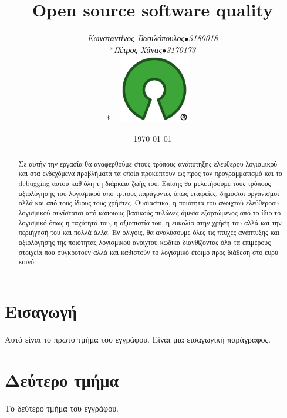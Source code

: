 \documentclass{article}
\title{\textbf{\textlatin{Open source software quality}}}
\author{{\textit{Κωνσταντίνος Βασιλόπουλος\(\bullet\)3180018}\\*\textit{Πέτρος Χάνας\(\bullet\)3170173}}\\*\includegraphics[width=4cm, height=3cm]{oSource}}
\date{\today}
\begin{document}
\maketitle

\begin{abstract}
Σε αυτήν την εργασία θα αναφερθούμε στους τρόπους ανάπυτηξης ελεύθερου λογισμικού
και στα ενδεχόμενα προβλήματα τα οποία προκύπτουν ως προς τον προγραμματισμό και το 
\textlatin{debugging} αυτού καθ'όλη τη διάρκεια ζωής του. Επίσης θα μελετήσουμε τους 
τρόπους αξιολόγησης του λογισμικού από τρίτους παράγοντες όπως εταιρείες, δημόσιοι οργανισμοί 
αλλά και από τους ίδιους τους χρήστες. Ουσιαστικα, η ποιότητα του ανοιχτού-ελεύθεροου λογισμικού 
συνίσταται από κάποιους βασικούς πυλώνες άμεσα εξαρτώμενος από το ίδιο το λογισμικό όπως η ταχύτητά
του, η αξιοπιστία του, η ευκολία στην χρήση του αλλά και την περιήγησή του και πολλά άλλα. Εν ολίγοις, 
θα αναλύσουμε όλες τις πτυχές ανάπτυξης και αξιολόγησης της ποιότητας λογισμικού ανοιχτού κώδικα 
διανθίζοντας όλα τα επιμέρους στοιχεία που συγκροτούν αλλά και καθιστούν το λογισμικό έτοιμο προς διάθεση 
στο ευρύ κοινό.

\end{abstract}

\section{Eισαγωγή}
Αυτό είναι το πρώτο τμήμα του εγγράφου. 
Είναι μια εισαγωγική παράγραφος.

\section{Δεύτερο τμήμα}
Το δεύτερο τμήμα του εγγράφου. 
\end{document}
